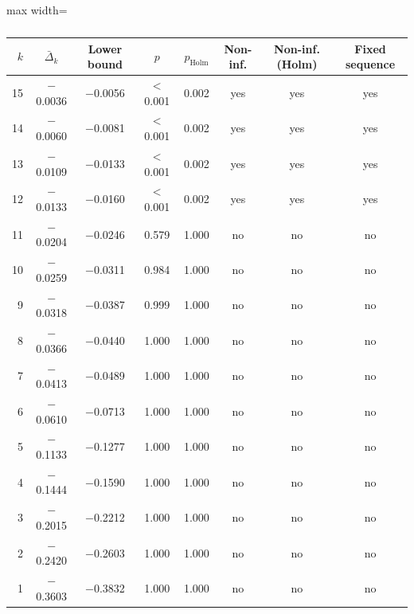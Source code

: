 \begin{table}[t]
\centering
\small
\caption{}
\label{tab:h1_holm}
\setlength{\tabcolsep}{4pt}
\begin{adjustbox}{max width=\textwidth}
\begin{tabular}{rccccccc}
\toprule
$k$ & $\bar\Delta_k$ & Lower bound & $p$ & $p_{\mathrm{Holm}}$ & Non-inf. & Non-inf. (Holm) & Fixed sequence \\
\midrule
15 & $-$0.0036 & $-$0.0056 & $<$0.001 & 0.002 & yes & yes & yes \\
14 & $-$0.0060 & $-$0.0081 & $<$0.001 & 0.002 & yes & yes & yes \\
13 & $-$0.0109 & $-$0.0133 & $<$0.001 & 0.002 & yes & yes & yes \\
12 & $-$0.0133 & $-$0.0160 & $<$0.001 & 0.002 & yes & yes & yes \\
11 & $-$0.0204 & $-$0.0246 & 0.579 & 1.000 & no & no & no \\
10 & $-$0.0259 & $-$0.0311 & 0.984 & 1.000 & no & no & no \\
9 & $-$0.0318 & $-$0.0387 & 0.999 & 1.000 & no & no & no \\
8 & $-$0.0366 & $-$0.0440 & 1.000 & 1.000 & no & no & no \\
7 & $-$0.0413 & $-$0.0489 & 1.000 & 1.000 & no & no & no \\
6 & $-$0.0610 & $-$0.0713 & 1.000 & 1.000 & no & no & no \\
5 & $-$0.1133 & $-$0.1277 & 1.000 & 1.000 & no & no & no \\
4 & $-$0.1444 & $-$0.1590 & 1.000 & 1.000 & no & no & no \\
3 & $-$0.2015 & $-$0.2212 & 1.000 & 1.000 & no & no & no \\
2 & $-$0.2420 & $-$0.2603 & 1.000 & 1.000 & no & no & no \\
1 & $-$0.3603 & $-$0.3832 & 1.000 & 1.000 & no & no & no \\
\bottomrule
\end{tabular}
\end{adjustbox}
\par\smallskip\parbox{0.95\linewidth}{\footnotesize {}}
\end{table}
